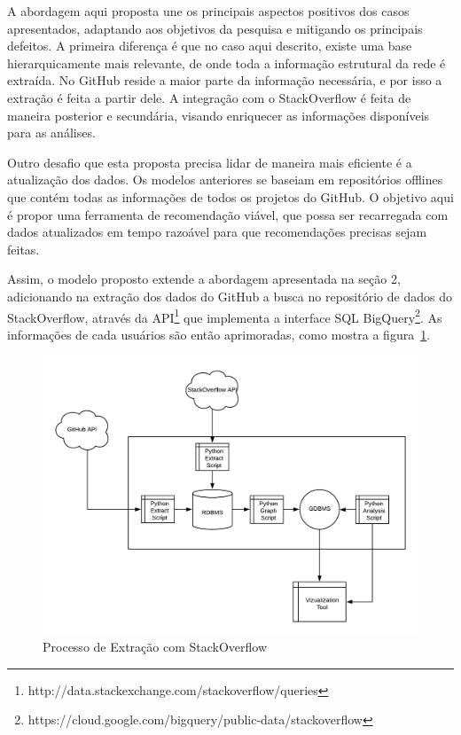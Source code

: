 \documentclass[sigconf]{acmart}
\begin{document}
A abordagem aqui proposta une os principais aspectos positivos dos casos apresentados, adaptando aos objetivos da pesquisa e mitigando os principais defeitos. A primeira diferença é que no caso aqui descrito, existe uma base hierarquicamente mais relevante, de onde toda a informação estrutural da rede é extraída. No GitHub reside a maior parte da informação necessária, e por isso a extração é feita a partir dele. A integração com o StackOverflow é feita de maneira posterior e secundária, visando enriquecer as informações disponíveis para as análises.

Outro desafio que esta proposta precisa lidar de maneira mais eficiente é a atualização dos dados. Os modelos anteriores se baseiam em repositórios offlines que contém todas as informações de todos os projetos do GitHub. O objetivo aqui é propor uma ferramenta de recomendação viável, que possa ser recarregada com dados atualizados em tempo razoável para que recomendações precisas sejam feitas.

Assim, o modelo proposto extende a abordagem apresentada na seção 2, adicionando na extração dos dados do GitHub a busca no repositório de dados do StackOverflow, através da API\footnote{http://data.stackexchange.com/stackoverflow/queries} que implementa a interface SQL BigQuery\footnote{https://cloud.google.com/bigquery/public-data/stackoverflow}. As informações de cada usuários são então aprimoradas, como mostra a figura~\ref{fig:processo_extracao_stackoverflow}.


\begin{figure}[!htbp]
 \includegraphics[width=\columnwidth]{processo_extracao_stackoverflow}
 \caption{Processo de Extração com StackOverflow}\label{fig:processo_extracao_stackoverflow}
\end{figure}
\end{document}
